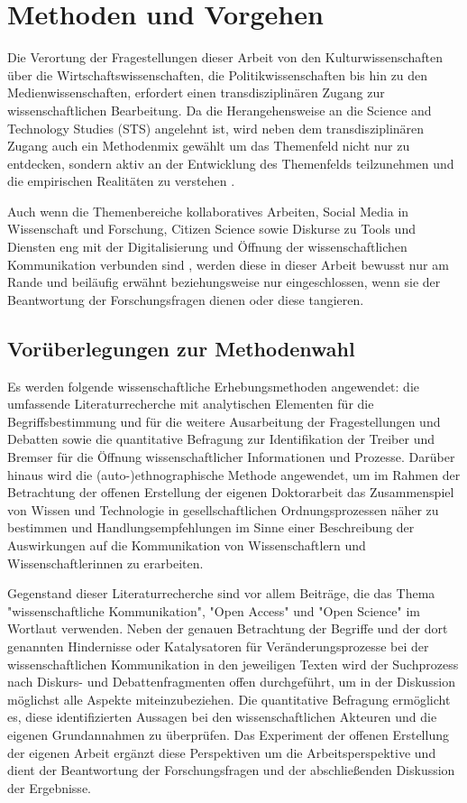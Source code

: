 \chapter{Methoden und Vorgehen}

Die Verortung der Fragestellungen dieser Arbeit von den Kulturwissenschaften über die Wirtschaftswissenschaften, die Politikwissenschaften bis hin zu den Medienwissenschaften, erfordert einen transdisziplinären Zugang zur wissenschaftlichen Bearbeitung. Da die Herangehensweise an die Science and Technology Studies (STS) angelehnt ist, wird neben dem transdisziplinären Zugang auch ein Methodenmix gewählt um das Themenfeld nicht nur zu entdecken, sondern aktiv an der Entwicklung des Themenfelds teilzunehmen \cite{MacKenzie_1999} und die empirischen Realitäten zu verstehen \cite{kelty_2014_freedom}.

Auch wenn die Themenbereiche kollaboratives Arbeiten, Social Media in Wissenschaft und Forschung, Citizen Science sowie Diskurse zu Tools und Diensten eng mit der Digitalisierung und Öffnung der wissenschaftlichen Kommunikation verbunden sind \cite{European_Commission_2015a}, werden diese in dieser Arbeit bewusst nur am Rande und beiläufig erwähnt beziehungsweise nur eingeschlossen, wenn sie der Beantwortung der Forschungsfragen dienen oder diese tangieren.

\section{Vorüberlegungen zur Methodenwahl}

Es werden folgende wissenschaftliche Erhebungsmethoden angewendet: die umfassende Literaturrecherche mit analytischen Elementen für die Begriffsbestimmung und für die weitere Ausarbeitung der Fragestellungen und Debatten sowie die quantitative Befragung zur Identifikation der Treiber und Bremser für die Öffnung wissenschaftlicher Informationen und Prozesse. Darüber hinaus wird die (auto-)ethnographische Methode angewendet, um im Rahmen der Betrachtung der offenen Erstellung der eigenen Doktorarbeit das Zusammenspiel von Wissen und Technologie in gesellschaftlichen Ordnungsprozessen näher zu bestimmen und Handlungsempfehlungen im Sinne einer Beschreibung der Auswirkungen auf die Kommunikation von Wissenschaftlern und Wissenschaftlerinnen zu erarbeiten.

Gegenstand dieser Literaturrecherche sind vor allem Beiträge, die das Thema "wissenschaftliche Kommunikation", "Open Access" und "Open Science" im Wortlaut verwenden. Neben der genauen Betrachtung der Begriffe und der dort genannten Hindernisse oder Katalysatoren für Veränderungsprozesse bei der wissenschaftlichen Kommunikation in den jeweiligen Texten wird der Suchprozess nach Diskurs- und Debattenfragmenten offen durchgeführt, um in der Diskussion möglichst alle Aspekte miteinzubeziehen. Die quantitative Befragung ermöglicht es, diese identifizierten Aussagen bei den wissenschaftlichen Akteuren und die eigenen Grundannahmen zu überprüfen. Das Experiment der offenen Erstellung der eigenen Arbeit ergänzt diese Perspektiven um die Arbeitsperspektive und dient der Beantwortung der Forschungsfragen und der abschließenden Diskussion der Ergebnisse.

